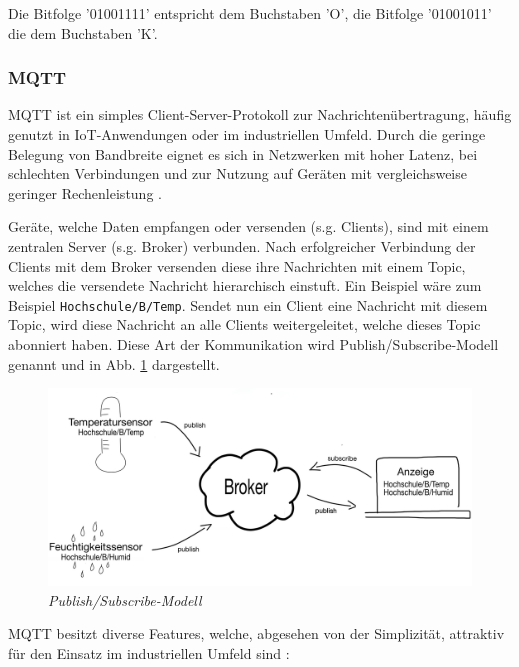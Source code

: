 Die Bitfolge '01001111' entspricht dem Buchstaben 'O', die Bitfolge '01001011' die dem Buchstaben 'K'.



\subsubsection{MQTT} 
\label{subsub: MQTT}

MQTT ist ein simples Client-Server-Protokoll zur Nachrichtenübertragung, häufig genutzt in \ac{IoT}-Anwendungen oder im industriellen Umfeld. Durch
die geringe Belegung von Bandbreite eignet es sich in Netzwerken mit hoher Latenz, bei schlechten Verbindungen und zur Nutzung auf Geräten
mit vergleichsweise geringer Rechenleistung \citep{MQTT_FAQ}.

\smallskip

Geräte, welche Daten empfangen oder versenden (s.g. Clients), sind mit einem zentralen Server (s.g. Broker) verbunden. Nach erfolgreicher Verbindung
der Clients mit dem Broker versenden diese ihre Nachrichten mit einem Topic, welches die versendete Nachricht hierarchisch einstuft.
Ein Beispiel wäre zum Beispiel \lstinline!Hochschule/B/Temp!. Sendet nun ein Client eine Nachricht mit diesem Topic, wird 
diese Nachricht an alle Clients weitergeleitet, welche dieses Topic abonniert haben. Diese Art der Kommunikation wird Publish/Subscribe-Modell 
genannt \citep{MQTT_Article} und in Abb. \ref{img:MQTT} dargestellt. 

\begin{figure}[h]
    \vspace{-\baselineskip}
        \centering
        \includegraphics[scale=0.5]{Pictures/brokerclient.png}
        \caption{\textit{Publish/Subscribe-Modell}}
        \label{img:MQTT}
\end{figure}

\smallskip

MQTT besitzt diverse Features, welche, abgesehen von der Simplizität, attraktiv für den Einsatz im industriellen Umfeld sind \citep{MQTT_Article}:


